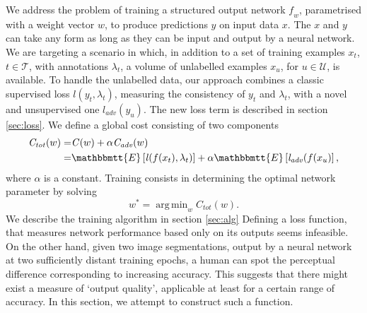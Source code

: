 \documentclass[a4paper]{article}
\DeclareMathOperator*{\argmin}{arg\,min}
\newcommand{\net}{\mathit{f}} %
\newcommand{\loss}{\mathit{l}}
\newcommand{\C}{\mathit{C}}
\newcommand{\TrainingIndexes}{\mathcal{T}}
\newcommand{\UnseenIndexes}{\mathcal{U}}
\newcommand{\expect}[1]{\mathbbmtt{E}\left[#1\right]}
\begin{document}
We address the problem of training a structured output network $\net_w$, parametrised with a weight vector $w$, to produce predictions $y$ on input data $x$.
The $x$ and $y$ can take any form as long as they can be input and output by a neural network.
We are targeting a scenario in which, in addition to a set of training examples $x_t$, $t\in\TrainingIndexes$, with annotations $\lambda_t$, a volume of unlabelled examples $x_u$, for $u\in\UnseenIndexes$, is available. 
To handle the unlabelled data, our approach combines a classic supervised loss $\loss(y_t,\lambda_t)$, measuring the consistency of $y_t$ and $\lambda_t$, with a novel and unsupervised one $\loss_\mathit{adv}(y_u)$. The new loss term is described in section \ref{sec:loss}. We define a global cost consisting of two components
\begin{equation} \label{fullCost}
  \begin{split}
    \C_\mathit{tot}(w) =& \C(w) + \alpha\C_\mathit{adv}(w) \\
    =& \expect{\loss(f(x_t),\lambda_t)} + \alpha \expect{\loss_\mathit{adv}(f(x_u)},
  \end{split}
\end{equation}
where $\alpha$ is a constant.
Training consists in determining the optimal network parameter by solving
\begin{equation} \label{fullObjective}
w^* = \argmin_{w} \C_\mathit{tot}(w) .
\end{equation}
We describe the training algorithm in section \ref{sec:alg}%
Defining a loss function, that measures network performance based only on its outputs seems infeasible. On the other hand, given two image segmentations, output by a neural network at two sufficiently distant training epochs, a human can spot the perceptual difference corresponding to increasing accuracy. This suggests that there might exist a measure of `output quality', applicable at least for a certain range of accuracy. In this section, we attempt to construct such a function.
\end{document}
